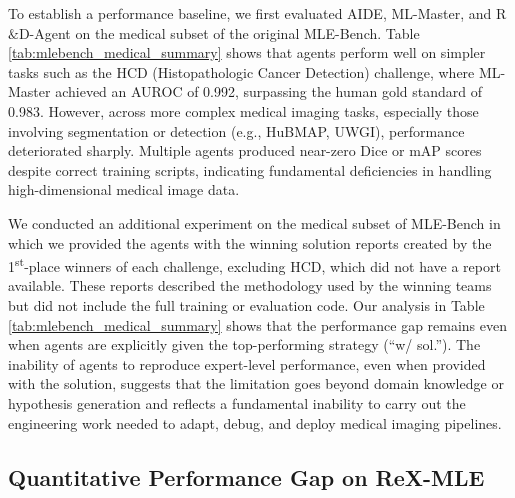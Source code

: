 \documentclass{midl} %
\begin{document}
To establish a performance baseline, we first evaluated AIDE, ML-Master, and R$\&$D-Agent on the medical subset of the original MLE-Bench. Table \ref{tab:mlebench_medical_summary} shows that agents perform well on simpler tasks such as the HCD (Histopathologic Cancer Detection) challenge, 
where ML-Master achieved an AUROC of 0.992, surpassing the human gold standard of 0.983. 
However, across more complex medical imaging tasks, especially those involving segmentation or detection (e.g., HuBMAP, UWGI), performance deteriorated sharply.
Multiple agents produced near-zero Dice or mAP scores despite correct training scripts, indicating fundamental deficiencies in handling high-dimensional medical image data.

We conducted an additional experiment on the medical subset of MLE-Bench in which we provided the agents with the winning solution reports created by the 1\textsuperscript{st}-place winners of each challenge, excluding HCD, which did not have a report available. These reports described the methodology used by the winning teams but did not include the full training or evaluation code. Our analysis in Table \ref{tab:mlebench_medical_summary} shows that the performance gap remains even when agents are explicitly given the top-performing strategy (``w/ sol.''). The inability of agents to reproduce expert-level performance, even when provided with the solution, suggests that the limitation goes beyond domain knowledge or hypothesis generation and reflects a fundamental inability to carry out the engineering work needed to adapt, debug, and deploy medical imaging pipelines.

\subsection{Quantitative Performance Gap on ReX-MLE}
\end{document}

